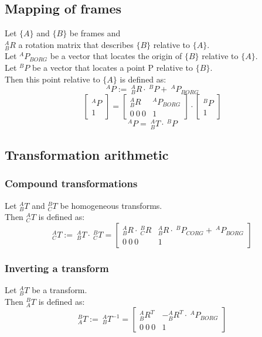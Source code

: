 \documentclass[10pt,a4paper]{article}
\newcommand{\vect}[1]{\ensuremath{\begin{bmatrix}#1\end{bmatrix}}}
\begin{document}
\subsection{Mapping of frames}
Let $\{A\}$ and $\{B\}$ be frames and\\
$^A_BR$ a rotation matrix that describes $\{B\}$ relative to $\{A\}$. \\
Let $^AP_{BORG}$ be a vector that locates the origin of $\{B\}$ relative to $\{A\}$. \\
Let $^BP$ be a vector that locates a point P relative to $\{B\}$. \\
Then this point relative to $\{A\}$ is defined as:
\begin{equation*}
^AP := ~^A_BR ⋅ ~^BP + ~^AP_{BORG}
\end{equation*}
\begin{equation*}
\vect{^AP \\ 1} = \left[\begin{array}{c|c}
^A_BR & ^AP_{BORG} \\ \hline 0~ 0~ 0 & 1
\end{array}\right] ⋅ \vect{^BP \\ 1}
\end{equation*}
\begin{equation*}
^AP =~ ^A_BT ⋅~^BP
\end{equation*}

\subsection{Transformation arithmetic}
\subsubsection{Compound transformations}
Let $^A_BT$ and $^B_CT$ be homogeneous transforms. \\
Then $^A_CT$ is defined as: \\
$$
^A_CT := ~^A_BT ⋅~ ^B_CT = \left[\begin{array}{c|c}
^A_BR ⋅~^B_CR & ^A_BR ⋅~^BP_{CORG} + ~^AP_{BORG} \\
\hline
0 ~0 ~0 & 1
\end{array}\right]
$$

\subsubsection{Inverting a transform}
Let $^A_BT$ be a transform. \\
Then $^B_AT$ is defined as: \\
$$
^B_AT := ~^A_BT^{-1} = \left[\begin{array}{c|c}
^A_BR^T & -^A_BR^T ⋅~^AP_{BORG} \\
\hline
0 ~0 ~0 & 1
\end{array}\right]
$$
\end{document}
